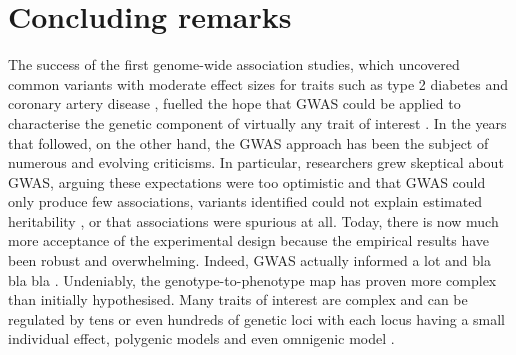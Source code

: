 
\chapter{Concluding remarks}  %
\label{chapter7}

The success of the first genome-wide association studies, which uncovered common variants with moderate effect sizes for traits such as type 2 diabetes \cite{scott2007genome} and coronary artery disease \cite{wellcome2007genome}, fuelled the hope that GWAS could be applied to characterise the genetic component of virtually any trait of interest
\cite{visscher2012five}. 
In the years that followed, on the other hand, the GWAS approach has been the subject of numerous and evolving criticisms.
In particular,
researchers grew skeptical about GWAS, arguing
these expectations were too optimistic and that GWAS could only produce few associations,
variants identified could not explain estimated heritability \cite{manolio2009finding}, or that associations were spurious at all.
Today, there is now much more acceptance of the experimental design because the empirical results have been robust and overwhelming.
Indeed, GWAS actually informed a lot and bla bla bla \cite{visscher2012five}. 
Undeniably, the genotype-to-phenotype map has proven more complex than initially hypothesised. 
Many traits of interest are complex and can be regulated by tens or even hundreds of genetic loci with each locus having a small individual effect, polygenic models \cite{}
and even omnigenic model \cite{boyle2017expanded}.
\\

